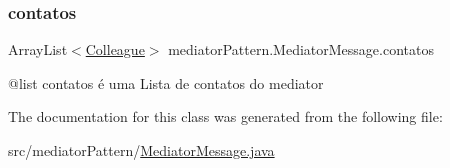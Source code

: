 \subsubsection{\texorpdfstring{contatos}{contatos}}
{\footnotesize\ttfamily Array\+List$<$\mbox{\hyperlink{classmediator_pattern_1_1_colleague}{Colleague}}$>$ mediator\+Pattern.\+Mediator\+Message.\+contatos\hspace{0.3cm}{\ttfamily [protected]}}



@list contatos é uma Lista de contatos do mediator 



The documentation for this class was generated from the following file\+:\begin{DoxyCompactItemize}
\item 
src/mediator\+Pattern/\mbox{\hyperlink{_mediator_message_8java}{Mediator\+Message.\+java}}\end{DoxyCompactItemize}
